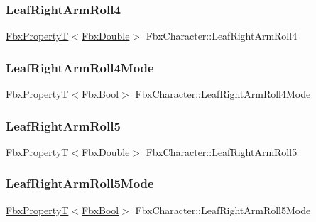 \subsubsection{\texorpdfstring{Leaf\+Right\+Arm\+Roll4}{LeafRightArmRoll4}}
{\footnotesize\ttfamily \hyperlink{class_fbx_property_t}{Fbx\+PropertyT}$<$\hyperlink{fbxtypes_8h_a171e72a1c46fc15c1a6c9c31948c1c5b}{Fbx\+Double}$>$ Fbx\+Character\+::\+Leaf\+Right\+Arm\+Roll4}

\mbox{\label{class_fbx_character_afaeb5a33929f72707cce2bc030edc837}} 
\subsubsection{\texorpdfstring{Leaf\+Right\+Arm\+Roll4\+Mode}{LeafRightArmRoll4Mode}}
{\footnotesize\ttfamily \hyperlink{class_fbx_property_t}{Fbx\+PropertyT}$<$\hyperlink{fbxtypes_8h_a92e0562b2fe33e76a242f498b362262e}{Fbx\+Bool}$>$ Fbx\+Character\+::\+Leaf\+Right\+Arm\+Roll4\+Mode}

\mbox{\label{class_fbx_character_a31a5a731e57e9495d2c3e3463cb81328}} 
\subsubsection{\texorpdfstring{Leaf\+Right\+Arm\+Roll5}{LeafRightArmRoll5}}
{\footnotesize\ttfamily \hyperlink{class_fbx_property_t}{Fbx\+PropertyT}$<$\hyperlink{fbxtypes_8h_a171e72a1c46fc15c1a6c9c31948c1c5b}{Fbx\+Double}$>$ Fbx\+Character\+::\+Leaf\+Right\+Arm\+Roll5}

\mbox{\label{class_fbx_character_a49c22d541bd008482ad38478ddb7c611}} 
\subsubsection{\texorpdfstring{Leaf\+Right\+Arm\+Roll5\+Mode}{LeafRightArmRoll5Mode}}
{\footnotesize\ttfamily \hyperlink{class_fbx_property_t}{Fbx\+PropertyT}$<$\hyperlink{fbxtypes_8h_a92e0562b2fe33e76a242f498b362262e}{Fbx\+Bool}$>$ Fbx\+Character\+::\+Leaf\+Right\+Arm\+Roll5\+Mode}


